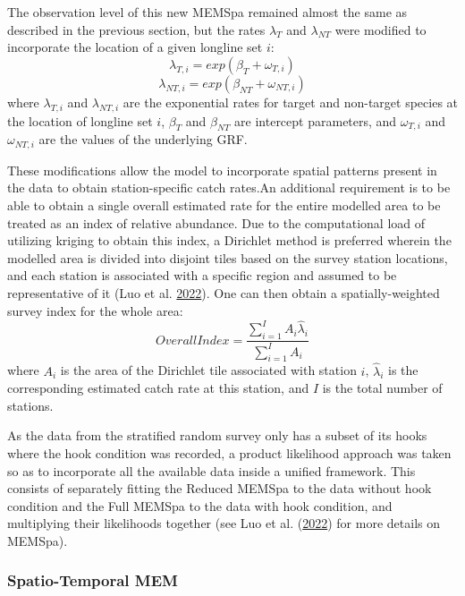 \documentclass[12pt]{article}\usepackage[]{graphicx}\usepackage[]{color}
\begin{document}
The observation level of this new MEMSpa remained almost the same as described in the previous section, but the rates \(\lambda_T\) and \(\lambda_{NT}\) were modified to incorporate the location of a given longline set \(i\):
\begin{equation}
\lambda_{T,i} = exp(\beta_T+\omega_{T,i})
\end{equation} \begin{equation}
\lambda_{NT,i} = exp(\beta_{NT}+\omega_{NT,i})
\end{equation}
where \(\lambda_{T,i}\) and \(\lambda_{NT,i}\) are the exponential rates for target and non-target species at the location of longline set \(i\), \(\beta_T\) and \(\beta_{NT}\) are intercept parameters, and \(\omega_{T,i}\) and \(\omega_{NT,i}\) are the values of the underlying GRF.

These modifications allow the model to incorporate spatial patterns present in the data to obtain station-specific catch rates.An additional requirement is to be able to obtain a single overall estimated rate for the entire modelled area to be treated as an index of relative abundance. Due to the computational load of utilizing kriging to obtain this index, a Dirichlet method is preferred wherein the modelled area is divided into disjoint tiles based on the survey station locations, and each station is associated with a specific region and assumed to be representative of it (Luo et al. \protect\hyperlink{ref-Luo2022}{2022}). One can then obtain a spatially-weighted survey index for the whole area:
\begin{equation}
Overall Index = \frac{\sum_{i=1}^I A_i \hat{\lambda}_i}{\sum_{i=1}^I A_i}
\end{equation}
where \(A_i\) is the area of the Dirichlet tile associated with station \(i\), \(\hat{\lambda}_i\) is the corresponding estimated catch rate at this station, and \(I\) is the total number of stations.

As the data from the stratified random survey only has a subset of its hooks where the hook condition was recorded, a product likelihood approach was taken so as to incorporate all the available data inside a unified framework. This consists of separately fitting the Reduced MEMSpa to the data without hook condition and the Full MEMSpa to the data with hook condition, and multiplying their likelihoods together (see Luo et al. (\protect\hyperlink{ref-Luo2022}{2022}) for more details on MEMSpa).

\hypertarget{spatio-temporal-mem}{%
\subsubsection{Spatio-Temporal MEM}\label{spatio-temporal-mem}}
\end{document}
